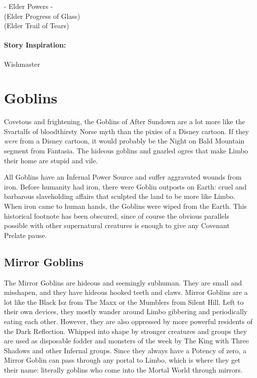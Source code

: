 - Elder Powers -\\
 (Elder Progress of Glass)\\
 (Elder Trail of Tears)

\paragraph{Story Inspiration:} Wishmaster

\section{Goblins} 

Covetous and frightening, the Goblins of After Sundown are a lot more like the Svartalfs of bloodthirsty Norse myth than the pixies of a Disney cartoon. If they \textit{were} from a Disney cartoon, it would probably be the Night on Bald Mountain segment from Fantasia. The hideous goblins and gnarled ogres that make Limbo their home are stupid and vile.

All Goblins have an Infernal Power Source and suffer aggravated wounds from iron. Before humanity had iron, there were Goblin outposts on Earth: cruel and barbarous slaveholding affairs that sculpted the land to be more like Limbo. When iron came to human hands, the Goblins were wiped from the Earth. This historical footnote has been obscured, since of course the obvious parallels possible with other supernatural creatures is enough to give any Covenant Prelate pause.

\subsection{Mirror Goblins} 

The Mirror Goblins are hideous and seemingly subhuman. They are small and misshapen, and they have hideous hooked teeth and claws. Mirror Goblins are a lot like the Black Isz from The Maxx or the Mumblers from Silent Hill. Left to their own devices, they mostly wander around Limbo gibbering and periodically eating each other. However, they are also oppressed by more powerful residents of the Dark Reflection. Whipped into shape by stronger creatures and groups they are used as disposable fodder and monsters of the week by The King with Three Shadows and other Infernal groups. Since they always have a Potency of zero, a Mirror Goblin can pass through any portal to Limbo, which is where they get their name: literally goblins who come into the Mortal World through mirrors.

